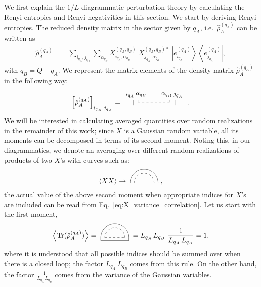 \documentclass[aps,pra,reprint,superscriptaddress,twocolumn,notitlepage]{revtex4-1}
\numberwithin{equation}{section}
\begin{document}
We first explain the $1/L$ diagrammatic perturbation theory by calculating the Renyi entropies and Renyi negativities in this section. 
We start by deriving Renyi entropies.
The reduced density matrix in the sector given by $q_A$, i.e.~$\hat \rho_{A}^{(q_A)}$ can be written as 
\begin{equation}\label{eq:rho_A_expansion}
\begin{aligned}
    \hat \rho_{A}^{(q_A)}  &= \sum_{i_{q_A}, j_{q_A}} \sum_{\alpha_{q_B}} 
    X_{i_{q_A}, \alpha_{q_B}}^{(q_A, q_B)} \; X_{j_{q_A}, \alpha_{q_B}}^{(q_A, q_B)\ast} \ \left| e_{i_{q_A}}^{(q_A)} \right\rangle \left\langle  e_{j_{q_A}}^{(q_A)} \right|,
\end{aligned}
\end{equation}
with $q_B = Q - q_A$.
We represent the matrix elements of the density matrix $\hat \rho_{A}^{(q_A)}$ in the following way:
\begin{equation}
    \left[ \hat \rho_{A}^{(q_A)}\right]_{i_{q_A}, j_{q_A}} =
    \,
    \tikz[scale=0.8,baseline=-0.5ex]{
    \draw[dashed] (0.,0.2)-- (0,0);
    \draw[dashed] (0,0) -- (2,0);
    \draw[dashed]  (2,0.2) -- (2,0);
    \draw (-0.3,0.2)-- (-0.3,-0.15);
    \draw (2.3,-0.15)-- (2.3,0.2);
    \draw (-0.5,0.5) circle (0.) node[anchor=center] {\footnotesize$i_{q_A}$};
    \draw (2.5,0.5) circle (0.) node[anchor=center] {\footnotesize$j_{q_A}$};
    \draw (0.2,0.5) circle (0.) node[anchor=center] {\footnotesize$ \alpha_{q_B} $};
    \draw (1.8,0.5) circle (0.) node[anchor=center] {\footnotesize$ \alpha_{q_B} $};
    }\ .
\end{equation}
We will be interested in calculating averaged quantities over random realizations in the remainder of this work; since $X$ is a Gaussian random variable, all its moments can be decomposed in terms of its second moment. Noting this, in our diagrammatics, we denote an averaging over different random realizations of products of two $X$'s with curves such as:
\begin{equation}
\left\langle X X  \right\rangle \to
\ 
    \tikz[baseline=0ex]{
    \draw[dashed] (1.0,0) arc (0:180:0.5);
    \draw (1.2,0.) arc (0:180:0.7);
    } \ ,
\end{equation}
the actual value of the above second moment when appropriate indices for $X$'s are included can be read from Eq.~\eqref{eq:X_variance_correlation}. Let us start with the first moment, 
\begin{equation}
     \left\langle\text{Tr}(\hat\rho_{A}^{(q_A)}) \right\rangle = \ 
    \tikz[baseline=0ex]{
    \draw[dashed] (1.0,0) arc (0:180:0.5);
    \draw[dashed] (0,0) -- (1,0);
    \draw (1.2,0.) arc (0:180:0.7);
    \draw (-0.2,0.0)-- (-0.2,-0.15)--(1.2,-0.15)-- (1.2,0.0);
    } \  = L_{q_A}\, L_{q_B} \ \frac1{L_{q_A} \, L_{q_B}} = 1.
\end{equation}
where it is understood that all possible indices should be summed over when there is a closed loop; the factor $L_{q_A}\ L_{q_B}$ comes from this rule. On the other hand, the factor $\frac1{L_{q_A} \, L_{q_B}}$ comes from the variance of the Gaussian variables.
\end{document}
